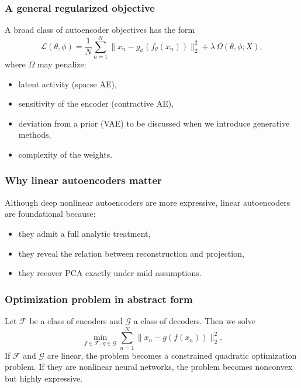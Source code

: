 \documentclass{beamer}
\begin{document}
\begin{frame}
\frametitle{A general regularized objective}

A broad class of autoencoder objectives has the form
\[
\mathcal{L}(\theta,\phi)
=
\frac{1}{N}\sum_{n=1}^N \|x_n-g_\phi(f_\theta(x_n))\|_2^2
+
\lambda\,\Omega(\theta,\phi;X),
\]
where \(\Omega\) may penalize:
\begin{block}{}
\begin{itemize}
\item latent activity (sparse AE),

\item sensitivity of the encoder (contractive AE),

\item deviation from a prior (VAE) to be discussed when we introduce generative methods,

\item complexity of the weights.
\end{itemize}

\noindent
\end{block}
\end{frame}

\begin{frame}
\frametitle{Why linear autoencoders matter}

Although deep nonlinear autoencoders are more expressive, linear autoencoders are foundational because:
\begin{block}{}
\begin{itemize}
\item they admit a full analytic treatment,

\item they reveal the relation between reconstruction and projection,

\item they recover PCA exactly under mild assumptions.
\end{itemize}

\noindent
\end{block}
\end{frame}

\begin{frame}
\frametitle{Optimization problem in abstract form}

Let \(\mathcal{F}\) be a class of encoders and \(\mathcal{G}\) a class of decoders. Then we solve
\[
\min_{f\in\mathcal{F},\, g\in\mathcal{G}}
\sum_{n=1}^N \|x_n-g(f(x_n))\|_2^2.
\]
If \(\mathcal{F}\) and \(\mathcal{G}\) are linear, the problem becomes a constrained quadratic optimization problem.
If they are nonlinear neural networks, the problem becomes nonconvex but highly expressive.
\end{frame}
\end{document}
